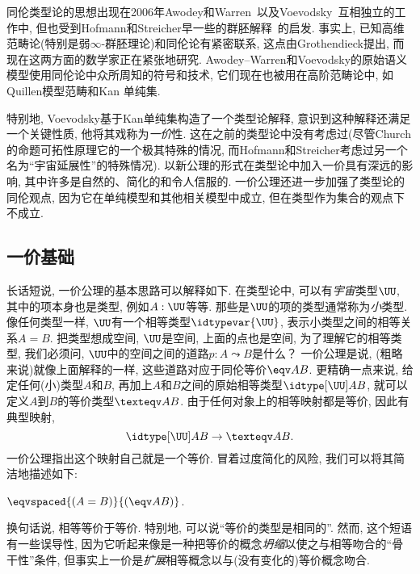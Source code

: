 同伦类型论的思想出现在2006年Awodey和Warren~\cite{AW}以及Voevodsky~\cite{VV}互相独立的工作中, 但也受到Hofmann和Streicher早一些的群胚解释~\cite{hs:gpd-typethy}的启发. 
事实上, 已知高维范畴论(特别是弱$\infty$-群胚理论)和同伦论有紧密联系, 这点由Grothendieck提出, 而现在这两方面的数学家正在紧张地研究. 
Awodey--Warren和Voevodsky的原始语义模型使用同伦论中众所周知的符号和技术, 它们现在也被用在高阶范畴论中, 如Quillen模型范畴和Kan 单纯集. 
%
%

特别地, Voevodsky基于Kan单纯集构造了一个类型论解释, 意识到这种解释还满足一个关键性质, 他将其戏称为\emph{一价}性. 
这在之前的类型论中没有考虑过(尽管Church的命题可拓性原理它的一个极其特殊的情况, 而Hofmann和Streicher考虑过另一个名为``宇宙延展性''的特殊情况). 
以新公理的形式在类型论中加入一价具有深远的影响, 其中许多是自然的、简化的和令人信服的. 
一价公理还进一步加强了类型论的同伦观点, 因为它在单纯模型和其他相关模型中成立, 但在类型作为集合的观点下不成立. 

\subsection*{一价基础}

长话短说, 一价公理的基本思路可以解释如下. 
在类型论中, 可以有\emph{宇宙}类型$\UU$, 其中的项本身也是类型, 例如$A : \UU$等等. 
那些是$\UU$的项的类型通常称为\emph{小}类型. 
%
%
像任何类型一样, $\UU$有一个相等类型$\idtypevar{\UU}$, 表示小类型之间的相等关系$A = B$.
把类型想成空间, $\UU$是空间, 上面的点也是空间, 为了理解它的相等类型, 我们必须问, $\UU$中的空间之间的道路$p : A \leadsto B$是什么？
一价公理是说, (粗略来说)就像上面解释的一样, 这些道路对应于同伦等价$\eqv A B$.
更精确一点来说, 给定任何(小)类型$A$和$B$, 再加上$A$和$B$之间的原始相等类型$\idtype[\UU]AB$, 就可以定义$A$到$B$的等价类型$\texteqv AB$.
由于任何对象上的相等映射都是等价, 因此有典型映射, 
\[\idtype[\UU]AB\to\texteqv AB.\]
一价公理指出这个映射自己就是一个等价. 
冒着过度简化的风险, 我们可以将其简洁地描述如下: 

\begin{description}%
\item[一价公理: ]  $\eqvspaced{(A = B)}{(\eqv A B)}$.
\end{description}
%
换句话说, 相等等价于等价. 
% 
特别地, 可以说``等价的类型是相同的''. 
然而, 这个短语有一些误导性, 因为它听起来像是一种把等价的概念\emph{坍缩}以使之与相等吻合的``骨干性''条件, 但事实上一价是\emph{扩展}相等概念以与(没有变化的)等价概念吻合. 

